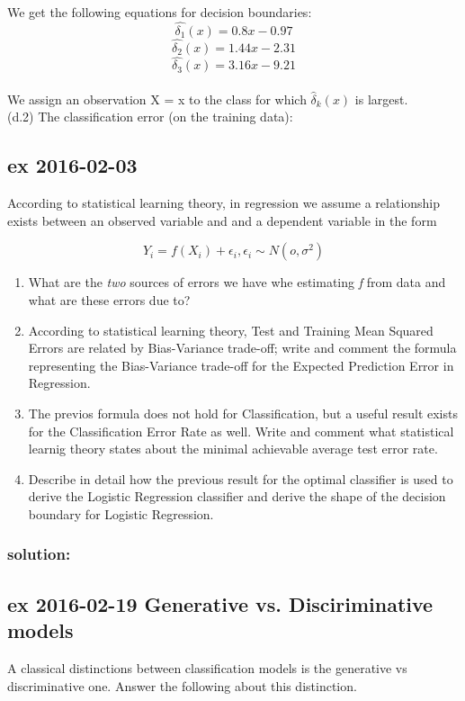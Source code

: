 \documentclass[a4paper,12pt,titlepage]{article} %
\begin{document}
We get the following equations for decision boundaries:
$$ \hat{\delta_{1}}(x) = 0.8 x - 0.97 $$
$$ \hat{\delta_{2}}(x) = 1.44 x - 2.31 $$
$$ \hat{\delta_{3}}(x) = 3.16 x - 9.21 $$\\

We assign an observation X = x to the class for which $ \hat{\delta}_{k}(x) $ is largest.\\

(d.2) The classification error (on the training data): 



\newpage

\subsection{ex 2016-02-03}
According to statistical learning theory, in regression we assume a relationship exists between an observed variable and and a dependent variable in the form 

$$ Y_{i} = f(X_{i}) + \epsilon_{i}, \epsilon_{i} \sim N(o, \sigma^{2})$$

\begin{enumerate}
\item What are the \textit{two} sources of errors we have whe estimating \textit{f} from data and what are these errors due to?
\item According to statistical learning theory, Test and Training Mean Squared Errors are related by Bias-Variance trade-off; write and comment the formula representing the Bias-Variance trade-off for the Expected Prediction Error in Regression.
\item The previos formula does not hold for Classification, but a useful result exists for the Classification Error Rate as well. Write and comment what statistical learnig theory states about the minimal achievable average test error rate.
\item Describe in detail how the previous result for the optimal classifier is used to derive the Logistic Regression classifier and derive the shape of the decision boundary for Logistic Regression.
\end{enumerate}

\subsubsection{solution:}


\newpage
\subsection{ex 2016-02-19 Generative vs. Disciriminative models}
A classical distinctions between classification models is the generative vs discriminative one. Answer the following about this distinction.
\end{document}
